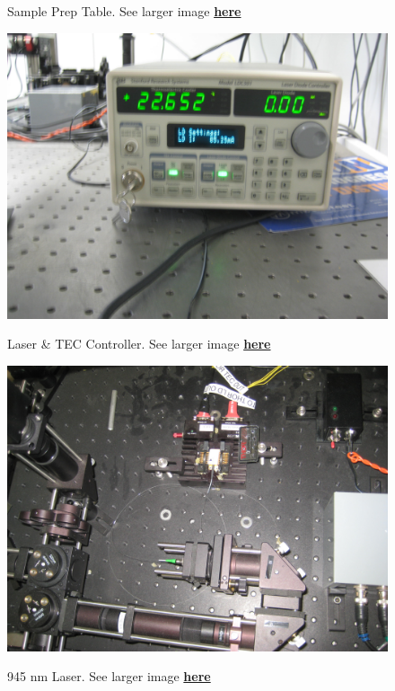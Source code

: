 \documentclass{../lab}
\begin{document}
\begin{figure}[H]
\begin{minipage}{0.32\textwidth}
    \caption{Sample Prep Table. See larger image \href{http://experimentationlab.berkeley.edu/sites/default/files/images/OTZ_Table_3555.jpg}{\textbf{here}}}
\end{minipage}
\begin{minipage}{0.32\textwidth}
    \href{http://experimentationlab.berkeley.edu/sites/default/files/images/OTZ_Laser_Controller_3553.jpg}{\includegraphics[width=\linewidth,keepaspectratio]{images/OTZ_Laser_Controller_3553.jpg}}
    \caption{Laser & TEC Controller. See larger image \href{http://experimentationlab.berkeley.edu/sites/default/files/images/OTZ_Laser_Controller_3553.jpg}{\textbf{here}}}
\end{minipage}
\begin{minipage}{0.32\textwidth}
    \href{http://experimentationlab.berkeley.edu/sites/default/files/images/OTZ_Laser_3550.jpg}{\includegraphics[width=\linewidth,keepaspectratio]{images/OTZ_Laser_3550.jpg}}
    \caption{945 nm Laser. See larger image \href{http://experimentationlab.berkeley.edu/sites/default/files/images/OTZ_Laser_3550.jpg}{\textbf{here}}}
\end{minipage}
\end{figure}
\end{document}
